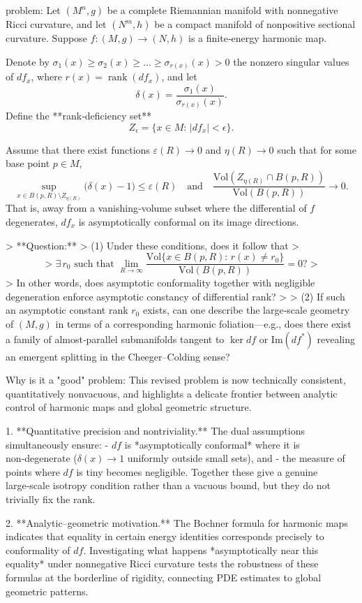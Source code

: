 problem:  
Let \((M^n,g)\) be a complete Riemannian manifold with nonnegative Ricci curvature, and let \((N^m,h)\) be a compact manifold of nonpositive sectional curvature.  
Suppose \(f:(M,g)\to(N,h)\) is a finite‑energy harmonic map.  

Denote by \(\sigma_1(x)\ge\sigma_2(x)\ge \dots \ge\sigma_{r(x)}(x)>0\) the nonzero singular values of \(df_x\), where \(r(x)=\operatorname{rank}(df_x)\), and let  
\[
\delta(x)=\frac{\sigma_1(x)}{\sigma_{r(x)}(x)}.
\]
Define the **rank‑deficiency set**
\[
Z_\epsilon=\{x\in M:\,|df_x|<\epsilon\}.
\]

Assume that there exist functions \(\varepsilon(R)\to0\) and \(\eta(R)\to0\) such that for some base point \(p\in M\),
\[
\sup_{x\in B(p,R)\setminus Z_{\eta(R)}}\bigl(\delta(x)-1\bigr)\le \varepsilon(R)
\quad\text{and}\quad
\frac{\mathrm{Vol}(Z_{\eta(R)}\cap B(p,R))}{\mathrm{Vol}(B(p,R))}\to0.
\]
That is, away from a vanishing‑volume subset where the differential of \(f\) degenerates, \(df_x\) is asymptotically conformal on its image directions.

> **Question:**  
> (1) Under these conditions, does it follow that  
> \[
> \exists\,r_0\text{ such that }\lim_{R\to\infty}\frac{\mathrm{Vol}\{x\in B(p,R):\, r(x)\ne r_0\}}{\mathrm{Vol}(B(p,R))}=0?
> \]
> In other words, does asymptotic conformality together with negligible degeneration enforce asymptotic constancy of differential rank?  
>  
> (2) If such an asymptotic constant rank \(r_0\) exists, can one describe the large‑scale geometry of \((M,g)\) in terms of a corresponding harmonic foliation—e.g., does there exist a family of almost‑parallel submanifolds tangent to \(\ker df\) or \(\mathrm{Im}(df^*)\) revealing an emergent splitting in the Cheeger–Colding sense?

Why is it a "good" problem:  
This revised problem is now technically consistent, quantitatively nonvacuous, and highlights a delicate frontier between analytic control of harmonic maps and global geometric structure.

1. **Quantitative precision and nontriviality.**  
   The dual assumptions simultaneously ensure:  
   - \(df\) is *asymptotically conformal* where it is non‑degenerate (\(\delta(x)\to1\) uniformly outside small sets), and  
   - the measure of points where \(df\) is tiny becomes negligible.  
   Together these give a genuine large‑scale isotropy condition rather than a vacuous bound, but they do not trivially fix the rank.

2. **Analytic–geometric motivation.**  
   The Bochner formula for harmonic maps indicates that equality in certain energy identities corresponds precisely to conformality of \(df\). Investigating what happens *asymptotically near this equality* under nonnegative Ricci curvature tests the robustness of these formulas at the borderline of rigidity, connecting PDE estimates to global geometric patterns.

